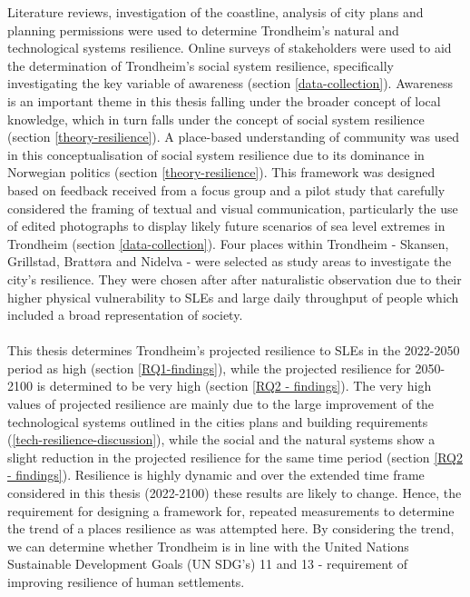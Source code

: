 Literature reviews, investigation of the coastline, analysis of city plans and planning permissions were used to determine Trondheim's natural and technological systems resilience. Online surveys of stakeholders were used to aid the determination of Trondheim's social system resilience, specifically investigating the key variable of awareness (section \ref{data-collection}). Awareness is an important theme in this thesis falling under the broader concept of local knowledge, which in turn falls under the concept of social system resilience (section \ref{theory-resilience}). A place-based understanding of community was used in this conceptualisation of social system resilience due to its dominance in Norwegian politics (section \ref{theory-resilience}). This framework was designed based on feedback received from a focus group and a pilot study that carefully considered the framing of textual and visual communication, particularly the use of edited photographs to display likely future scenarios of sea level extremes in Trondheim (section \ref{data-collection}). Four places within Trondheim - Skansen, Grillstad, Brattøra and Nidelva - were selected as study areas to investigate the city's resilience. They were chosen after after naturalistic observation due to their higher physical vulnerability to SLEs and large daily throughput of people which included a broad representation of society.

\paragraph{}
This thesis determines Trondheim's projected resilience to SLEs in the 2022-2050 period as high (section \ref{RQ1-findings}), while the projected resilience for 2050-2100 is determined to be very high (section \ref{RQ2 - findings}). The very high values of projected resilience are mainly due to the large improvement of the technological systems outlined in the cities plans and building requirements (\ref{tech-resilience-discussion}), while the social and the natural systems show a slight reduction  in the projected resilience for the same time period (section \ref{RQ2 - findings}). Resilience is highly dynamic and over the extended time frame considered in this thesis (2022-2100) these results are likely to change. Hence, the requirement for designing a framework for, repeated measurements to determine the trend of a places resilience as was attempted here. By considering the trend, we can determine whether Trondheim is in line with the United Nations Sustainable Development Goals (UN SDG’s) 11 and 13 - requirement of improving resilience of human settlements.

